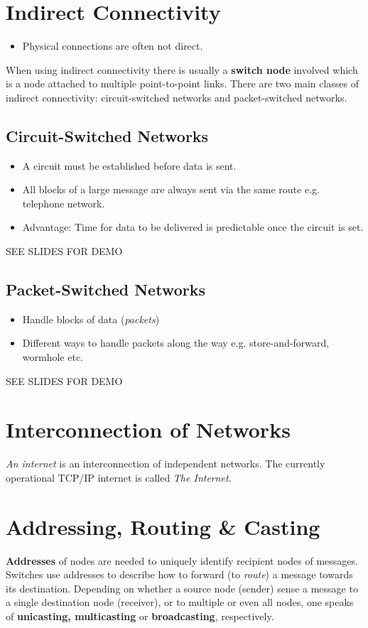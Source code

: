 \documentclass[11pt]{article}
\begin{document}
\section{Indirect Connectivity}
\label{sec:org62cd7e8}
\begin{itemize}
\item Physical connections are often not direct.
\end{itemize}
When using indirect connectivity there is usually a \textbf{switch node} involved which is a node attached to multiple point-to-point links.
There are two main classes of indirect connectivity: circuit-switched networks and packet-switched networks.

\subsection{Circuit-Switched Networks}
\label{sec:org3f6c490}
\begin{itemize}
\item A circuit must be established before data is sent.
\item All blocks of a large message are always sent via the same route e.g. telephone network.
\item Advantage: Time for data to be delivered is predictable once the circuit is set.
\end{itemize}
SEE SLIDES FOR DEMO

\subsection{Packet-Switched Networks}
\label{sec:orgd794909}
\begin{itemize}
\item Handle blocks of data (\emph{packets})
\item Different ways to handle packets along the way e.g. store-and-forward, wormhole etc.
\end{itemize}
SEE SLIDES FOR DEMO

\section{Interconnection of Networks}
\label{sec:org5952d75}
\emph{An internet} is an interconnection of independent networks.
The currently operational TCP/IP internet is called \emph{The Internet}.

\section{Addressing, Routing \& Casting}
\label{sec:orgdbe2976}
\textbf{Addresses} of nodes are needed to uniquely identify recipient nodes of messages.
Switches use addresses to describe how to forward (to \emph{route}) a message towards its destination.
Depending on whether a source node (sender) sense a message to a single destination node (receiver), or to multiple or even all nodes, one speaks of \textbf{unicasting, multicasting} or \textbf{broadcasting}, respectively.
\end{document}
